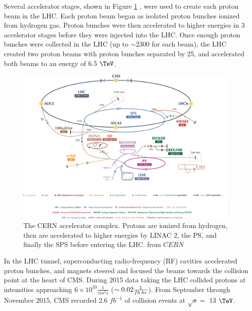 Several accelerator stages, shown in Figure \ref{fig:accelComplex} \cite{cernAccelSys}, were used to create each proton beam in the LHC.  
Each proton beam began as isolated proton bunches ionized from hydrogen gas.  Proton bunches were then accelerated to higher 
energies in 3 accelerator stages before they were injected into the LHC.  Once enough proton bunches were 
collected in the LHC (up to $\sim$2300 for each beam), the LHC created two proton beams with proton bunches separated by 
25\ns, and accelerated both beams to an energy of 6.5 $\TeV$.

\begin{figure}[ht]
	\centering
	\includegraphics[width=1\textwidth]{figures/CERNAcceleratorComplex.png}
	\caption{The CERN accelerator complex.  Protons are ionized from hydrogen, then are accelerated to higher 
	energies by LINAC 2, the PS, and finally the SPS before entering the LHC. from $CERN$}
	\label{fig:accelComplex}
\end{figure}


In the LHC tunnel, superconducting radio-frequency (RF) cavities accelerated proton bunches, and magnets steered and 
focused the beams towards the collision point at the heart of CMS.  
During 2015 data taking the LHC collided protons at intensities approaching $6 \times 10^{33} \frac{1}{cm^{2}s}$ ($\sim 0.02 \frac{1}{fb\thickspace hr}$).  
From September through November 2015, CMS recorded 2.6 $fb^{-1}$ of collision events at $\sqrt{s} =$ 13 $\TeV$.

